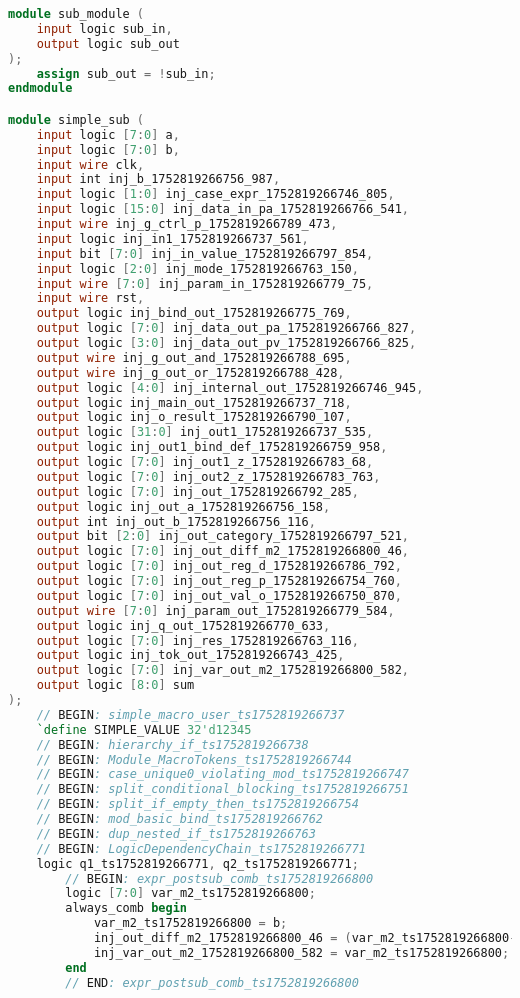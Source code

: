 \begin{lstlisting}[language=Verilog]
module sub_module (
    input logic sub_in,
    output logic sub_out
);
    assign sub_out = !sub_in;
endmodule

module simple_sub (
    input logic [7:0] a,
    input logic [7:0] b,
    input wire clk,
    input int inj_b_1752819266756_987,
    input logic [1:0] inj_case_expr_1752819266746_805,
    input logic [15:0] inj_data_in_pa_1752819266766_541,
    input wire inj_g_ctrl_p_1752819266789_473,
    input logic inj_in1_1752819266737_561,
    input bit [7:0] inj_in_value_1752819266797_854,
    input logic [2:0] inj_mode_1752819266763_150,
    input wire [7:0] inj_param_in_1752819266779_75,
    input wire rst,
    output logic inj_bind_out_1752819266775_769,
    output logic [7:0] inj_data_out_pa_1752819266766_827,
    output logic [3:0] inj_data_out_pv_1752819266766_825,
    output wire inj_g_out_and_1752819266788_695,
    output wire inj_g_out_or_1752819266788_428,
    output logic [4:0] inj_internal_out_1752819266746_945,
    output logic inj_main_out_1752819266737_718,
    output logic inj_o_result_1752819266790_107,
    output logic [31:0] inj_out1_1752819266737_535,
    output logic inj_out1_bind_def_1752819266759_958,
    output logic [7:0] inj_out1_z_1752819266783_68,
    output logic [7:0] inj_out2_z_1752819266783_763,
    output logic [7:0] inj_out_1752819266792_285,
    output logic inj_out_a_1752819266756_158,
    output int inj_out_b_1752819266756_116,
    output bit [2:0] inj_out_category_1752819266797_521,
    output logic [7:0] inj_out_diff_m2_1752819266800_46,
    output logic [7:0] inj_out_reg_d_1752819266786_792,
    output logic [7:0] inj_out_reg_p_1752819266754_760,
    output logic [7:0] inj_out_val_o_1752819266750_870,
    output wire [7:0] inj_param_out_1752819266779_584,
    output logic inj_q_out_1752819266770_633,
    output logic [7:0] inj_res_1752819266763_116,
    output logic inj_tok_out_1752819266743_425,
    output logic [7:0] inj_var_out_m2_1752819266800_582,
    output logic [8:0] sum
);
    // BEGIN: simple_macro_user_ts1752819266737
    `define SIMPLE_VALUE 32'd12345
    // BEGIN: hierarchy_if_ts1752819266738
    // BEGIN: Module_MacroTokens_ts1752819266744
    // BEGIN: case_unique0_violating_mod_ts1752819266747
    // BEGIN: split_conditional_blocking_ts1752819266751
    // BEGIN: split_if_empty_then_ts1752819266754
    // BEGIN: mod_basic_bind_ts1752819266762
    // BEGIN: dup_nested_if_ts1752819266763
    // BEGIN: LogicDependencyChain_ts1752819266771
    logic q1_ts1752819266771, q2_ts1752819266771;
        // BEGIN: expr_postsub_comb_ts1752819266800
        logic [7:0] var_m2_ts1752819266800;
        always_comb begin
            var_m2_ts1752819266800 = b;
            inj_out_diff_m2_1752819266800_46 = (var_m2_ts1752819266800--) - a;
            inj_var_out_m2_1752819266800_582 = var_m2_ts1752819266800;
        end
        // END: expr_postsub_comb_ts1752819266800


\end{lstlisting}
